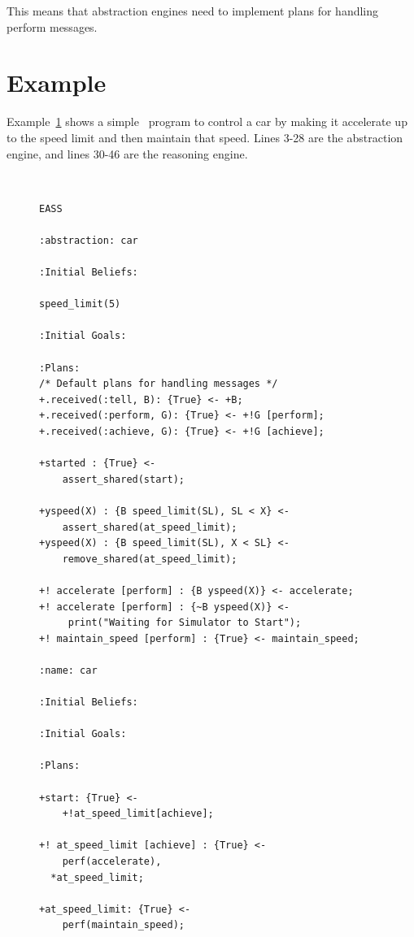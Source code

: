 This means that abstraction engines need to implement plans for handling perform messages.

\section{Example}
Example~\ref{code:EASSexample} shows a simple \eass\ program to control a car by making it accelerate up to the speed limit and then maintain that speed.  Lines 3-28 are the abstraction engine, and lines 30-46 are the reasoning engine.

\begin{figure}[!htbp]
\begin{ourexample}
\label{code:EASSexample} \quad \\
\begin{lstlisting}[basicstyle=\sffamily,style=easslisting,language=Gwendolen]
EASS

:abstraction: car

:Initial Beliefs:

speed_limit(5)
											
:Initial Goals:
		
:Plans: 
/* Default plans for handling messages */
+.received(:tell, B): {True} <- +B;   
+.received(:perform, G): {True} <- +!G [perform];
+.received(:achieve, G): {True} <- +!G [achieve];

+started : {True} <-
	assert_shared(start);

+yspeed(X) : {B speed_limit(SL), SL < X} <-
	assert_shared(at_speed_limit);
+yspeed(X) : {B speed_limit(SL), X < SL} <-
	remove_shared(at_speed_limit);
	
+! accelerate [perform] : {B yspeed(X)} <- accelerate;
+! accelerate [perform] : {~B yspeed(X)} <- 
     print("Waiting for Simulator to Start");
+! maintain_speed [perform] : {True} <- maintain_speed;

:name: car
			
:Initial Beliefs:
													
:Initial Goals:
		
:Plans: 

+start: {True} <-
	+!at_speed_limit[achieve];

+! at_speed_limit [achieve] : {True} <-
	perf(accelerate),
  *at_speed_limit;

+at_speed_limit: {True} <-
	perf(maintain_speed);
\end{lstlisting}
\end{ourexample}
\end{figure}

